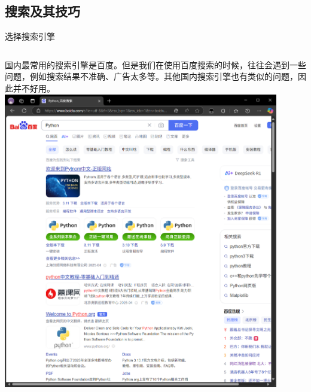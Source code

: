 \documentclass{beamer}
\begin{document}
\subsection{搜索及其技巧}

\begin{frame}{选择搜索引擎}
    \begin{columns}[T]
            国内最常用的搜索引擎是百度。但是我们在使用百度搜索的时候，往往会遇到一些问题，例如搜索结果不准确、广告太多等。其他国内搜索引擎也有类似的问题，因此并不好用。
            \includegraphics[width=0.9\textwidth]{4-1-Baidu.png}
    \end{columns}
\end{frame}
\end{document}

